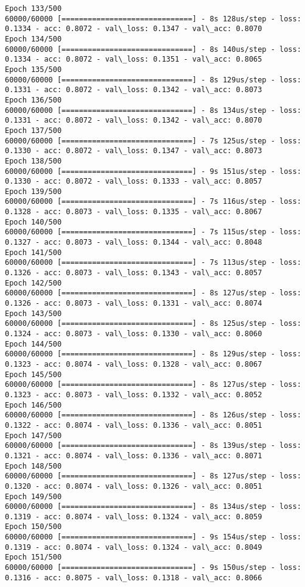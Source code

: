 \documentclass[11pt]{article}
\begin{document}
\begin{Verbatim}[commandchars=\\\{\}]
Epoch 133/500
60000/60000 [==============================] - 8s 128us/step - loss: 0.1334 - acc: 0.8072 - val\_loss: 0.1347 - val\_acc: 0.8070
Epoch 134/500
60000/60000 [==============================] - 8s 140us/step - loss: 0.1334 - acc: 0.8072 - val\_loss: 0.1351 - val\_acc: 0.8065
Epoch 135/500
60000/60000 [==============================] - 8s 129us/step - loss: 0.1331 - acc: 0.8072 - val\_loss: 0.1342 - val\_acc: 0.8073
Epoch 136/500
60000/60000 [==============================] - 8s 134us/step - loss: 0.1331 - acc: 0.8072 - val\_loss: 0.1342 - val\_acc: 0.8070
Epoch 137/500
60000/60000 [==============================] - 7s 125us/step - loss: 0.1330 - acc: 0.8072 - val\_loss: 0.1347 - val\_acc: 0.8073
Epoch 138/500
60000/60000 [==============================] - 9s 151us/step - loss: 0.1330 - acc: 0.8072 - val\_loss: 0.1333 - val\_acc: 0.8057
Epoch 139/500
60000/60000 [==============================] - 7s 116us/step - loss: 0.1328 - acc: 0.8073 - val\_loss: 0.1335 - val\_acc: 0.8067
Epoch 140/500
60000/60000 [==============================] - 7s 115us/step - loss: 0.1327 - acc: 0.8073 - val\_loss: 0.1344 - val\_acc: 0.8048
Epoch 141/500
60000/60000 [==============================] - 7s 113us/step - loss: 0.1326 - acc: 0.8073 - val\_loss: 0.1343 - val\_acc: 0.8057
Epoch 142/500
60000/60000 [==============================] - 8s 127us/step - loss: 0.1326 - acc: 0.8073 - val\_loss: 0.1331 - val\_acc: 0.8074
Epoch 143/500
60000/60000 [==============================] - 8s 125us/step - loss: 0.1324 - acc: 0.8073 - val\_loss: 0.1330 - val\_acc: 0.8060
Epoch 144/500
60000/60000 [==============================] - 8s 129us/step - loss: 0.1323 - acc: 0.8074 - val\_loss: 0.1328 - val\_acc: 0.8067
Epoch 145/500
60000/60000 [==============================] - 8s 127us/step - loss: 0.1323 - acc: 0.8073 - val\_loss: 0.1332 - val\_acc: 0.8052
Epoch 146/500
60000/60000 [==============================] - 8s 126us/step - loss: 0.1322 - acc: 0.8074 - val\_loss: 0.1336 - val\_acc: 0.8051
Epoch 147/500
60000/60000 [==============================] - 8s 139us/step - loss: 0.1321 - acc: 0.8074 - val\_loss: 0.1336 - val\_acc: 0.8071
Epoch 148/500
60000/60000 [==============================] - 8s 127us/step - loss: 0.1320 - acc: 0.8074 - val\_loss: 0.1326 - val\_acc: 0.8051
Epoch 149/500
60000/60000 [==============================] - 8s 134us/step - loss: 0.1319 - acc: 0.8074 - val\_loss: 0.1324 - val\_acc: 0.8059
Epoch 150/500
60000/60000 [==============================] - 9s 154us/step - loss: 0.1319 - acc: 0.8074 - val\_loss: 0.1324 - val\_acc: 0.8049
Epoch 151/500
60000/60000 [==============================] - 9s 150us/step - loss: 0.1316 - acc: 0.8075 - val\_loss: 0.1318 - val\_acc: 0.8066

\end{Verbatim}
\end{document}
